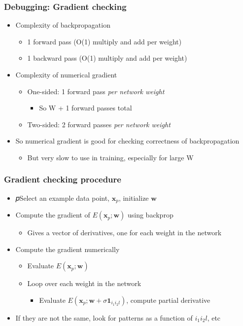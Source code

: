 \documentclass[12pt,notes,mathserif]{beamer}
\begin{document}
\begin{frame}[c]
\frametitle{Debugging: Gradient checking}
\begin{itemize}
\item  Complexity of backpropagation
		\begin{itemize}
		\item 1 forward pass (O(1) multiply and add per weight)
		\item 1 backward pass (O(1) multiply and add per weight)
		\end{itemize}
\item  Complexity of numerical gradient
		\begin{itemize}
		\item One-sided: 1 forward pass \textit{per network weight}
				\begin{itemize}
				\item  So W + 1 forward passes total
				\end{itemize}
		\item Two-sided: 2 forward passes \textit{per network weight}

		\end{itemize}
\item  So numerical gradient is good for checking correctness of backpropagation

		\begin{itemize}
		\item But very slow to use in training, especially for large W
		\end{itemize}
\end{itemize}
\end{frame}


\begin{frame}[c]
\frametitle{Gradient checking procedure}
\begin{itemize}
\item 𝑝Select an example data point, $\mathbf{x}_p$, initialize $\mathbf{w}$
\item Compute the gradient of $E(\mathbf{x}_p;\mathbf{w})$ using backprop
		\begin{itemize}
		\item Gives a vector of derivatives, one for each weight in the network
		\end{itemize}
\item Compute the gradient numerically
		\begin{itemize}
		\item Evaluate $E(\mathbf{x}_p;\mathbf{w})$
		\item Loop over each weight in the network
			\begin{itemize}
			\item Evaluate $E(\mathbf{x}_p;\mathbf{w}+\sigma \mathbf{1}_{i_1i_2l})$, compute partial derivative
			\end{itemize}
		\end{itemize}
\item If they are not the same, look for patterns as a
function of $i_1i_2l$, etc
\end{itemize}
\end{frame}
\end{document}

